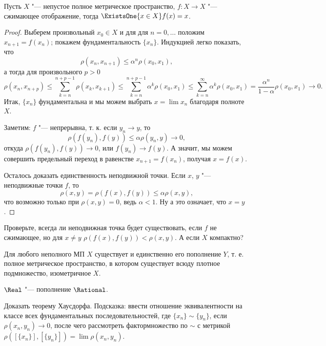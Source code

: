 \documentclass[main]{subfiles}
\begin{document}
\begin{theorem}
  Пусть \( X \) "--- непустое полное метрическое пространство,
  \( f : X \to X \) "--- сжимающее отображение,
  тогда \( \ExistsOne{x \in X} f(x) = x \).
\end{theorem}
\begin{proof}
  Выберем произвольный \( x_0 \in X \) и для
  для \( n = 0, \dots \) положим \( x_{n + 1} = f(x_n) \);
  покажем фундаментальность \( \{ x_n \} \).
  Индукцией легко показать, что
  \[
    \rho(x_n, x_{n+1}) \le \alpha^n \rho(x_0, x_1),
  \]
  а тогда для произвольного \( p > 0 \)
  \[
    \rho(x_n, x_{n+p}) \le
    \sum_{k = n}^{n + p - 1} \rho(x_k, x_{k + 1}) \le
    \sum_{k = n}^{n + p - 1} \alpha^k \rho(x_0, x_1) \le
    \sum_{k = n}^\infty \alpha^k \rho(x_0, x_1) =
    \frac{\alpha^n}{1 - \alpha} \rho(x_0, x_1) \to 0.
  \]
  Итак, \( \{ x_n \} \) фундаментальна и мы можем выбрать
  \( x = \lim x_n \) благодаря полноте \( X \).

  Заметим: \( f \) "--- непрерывна, т. к.
  если \( y_n \to y \), то
  \[
    \rho(f(y_n), f(y)) \le \alpha \rho(y_n, y) \to 0,
  \]
  откуда \( \rho(f(y_n), f(y)) \to 0 \), или
  \( f(y_n) \to f(y) \).
  А значит, мы можем совершить предельный переход
  в равенстве \( x_{n + 1} = f(x_n) \), получая
  \( x = f(x) \).

  Осталось доказать единственность неподвижной точки.
  Если \( x \), \( y \) "--- неподвижные точки \( f \),
  то
  \[
    \rho(x, y) = \rho(f(x), f(y)) \le \alpha \rho(x, y),
  \]
  что возможно только при \( \rho(x, y) = 0 \),
  ведь \( \alpha < 1 \). Ну а это означает, что \( x = y \).
\end{proof}

\begin{exercise}
  Проверьте, всегда ли неподвижная точка будет существовать,
  если \( f \) не сжимающее, но для \( x \ne y \)
  \( \rho(f(x), f(y)) < \rho(x, y) \). А если \( X \) компактно?
\end{exercise}

\begin{theorem}[Хаусдорф, б/д]
  Для любого неполного МП \( X \) существует и единственно его
  пополнение \( Y \), т. е. полное метрическое пространство,
  в котором существует всюду плотное подмножество, изометричное \( X \).
\end{theorem}

\begin{example}
  \( \Real \) "--- пополнение \( \Rational \).
\end{example}

\begin{exercise}
  Доказать теорему Хаусдорфа. Подсказка: ввести
  отношение эквивалентности на классе всех
  фундаментальных последовательностей,
  где \( \{ x_n \} \sim \{ y_n \} \),
  если \( \rho(x_n, y_n) \to 0 \),
  после чего рассмотреть фактормножество по \( \sim \)
  с метрикой
  \( \rho([\{ x_n \}], [\{ y_n \}]) = \lim \rho(x_n, y_n) \).
\end{exercise}
\end{document}
